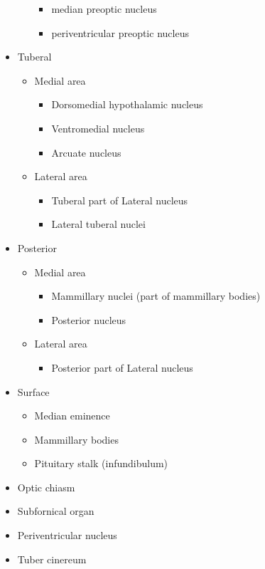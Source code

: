 \begin{itemize}
\begin{itemize}
    \begin{itemize}
    \tightlist
    \item
      median preoptic nucleus
    \item
      periventricular preoptic nucleus
    \end{itemize}
  \end{itemize}
\item
  Tuberal

  \begin{itemize}
  \tightlist
  \item
    Medial area

    \begin{itemize}
    \tightlist
    \item
      Dorsomedial hypothalamic nucleus
    \item
      Ventromedial nucleus
    \item
      Arcuate nucleus
    \end{itemize}
  \item
    Lateral area

    \begin{itemize}
    \tightlist
    \item
      Tuberal part of Lateral nucleus
    \item
      Lateral tuberal nuclei
    \end{itemize}
  \end{itemize}
\item
  Posterior

  \begin{itemize}
  \tightlist
  \item
    Medial area

    \begin{itemize}
    \tightlist
    \item
      Mammillary nuclei (part of mammillary bodies)
    \item
      Posterior nucleus
    \end{itemize}
  \item
    Lateral area

    \begin{itemize}
    \tightlist
    \item
      Posterior part of Lateral nucleus
    \end{itemize}
  \end{itemize}
\item
  Surface

  \begin{itemize}
  \tightlist
  \item
    Median eminence
  \item
    Mammillary bodies
  \item
    Pituitary stalk (infundibulum)
  \end{itemize}
\item
  Optic chiasm
\item
  Subfornical organ
\item
  Periventricular nucleus
\item
  Tuber cinereum


\end{itemize}
